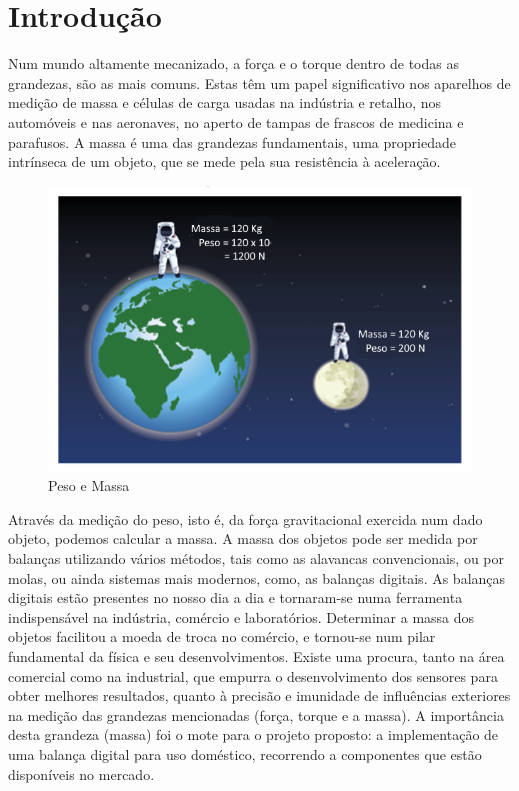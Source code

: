 \chapter{Introdução}
Num mundo altamente mecanizado, a força e o torque dentro de todas as grandezas, são as mais comuns. Estas têm um papel significativo nos aparelhos de medição de massa e células de carga usadas na indústria e retalho, nos automóveis e nas aeronaves, no aperto de tampas de frascos de medicina e parafusos.\cite{book-9}
\emptyline
A massa é uma das grandezas fundamentais, uma propriedade intrínseca de um objeto, que se mede pela sua resistência à aceleração.\cite{book-2}
\begin{figure}[H]
	\centering
	\includegraphics[width=.8\linewidth]{./image/PESTA/fisica/mass-1.png}
	\caption{Peso e Massa}
	\label{mass}
\end{figure}
Através da medição do peso, isto é, da força gravitacional exercida num dado objeto, podemos calcular a massa. \cite{book-2}
\emptyline
A massa dos objetos pode ser medida por balanças utilizando vários métodos, tais como as alavancas convencionais, ou por  molas, ou ainda sistemas mais modernos, como, as balanças digitais.
\emptyline
As balanças digitais estão presentes no nosso dia a dia e tornaram-se numa ferramenta indispensável na indústria, comércio e laboratórios. Determinar a massa dos objetos facilitou a moeda de troca no comércio, e tornou-se num pilar fundamental da física e seu desenvolvimentos.
\emptyline
Existe uma procura, tanto na área comercial como na industrial, que empurra o desenvolvimento dos sensores para obter melhores resultados, quanto à precisão e imunidade de influências exteriores na medição das grandezas mencionadas (força, torque e a massa).
\emptyline
A importância desta grandeza (massa) foi o mote para o projeto proposto: a implementação de uma balança digital para uso doméstico, recorrendo a componentes que estão disponíveis no mercado.
\newpage
